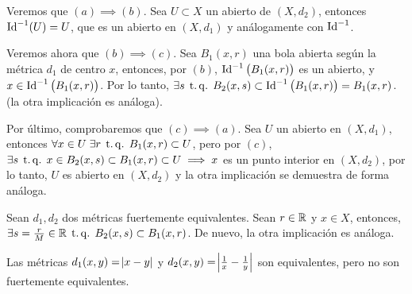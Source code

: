 \begin{eje}
    Veremos que $(a) \implies (b)$. Sea $U \subset X$ un abierto de $(X, d_2)$, entonces $\operatorname{Id}^{-1}(U) = U$, que es un abierto en $(X,d_1)$ y análogamente con $\operatorname{Id}^{-1}$.
    
    Veremos ahora que $(b) \implies (c)$. Sea $B_1(x, r)$ una bola abierta según la m\'etrica $d_1$ de centro $x$, entonces, por $(b)$, $\operatorname{Id}^{-1}\left( B_1(x,r) \right)$
    es un abierto, y $x \in \operatorname{Id}^{-1}\left( B_1(x,r) \right)$. Por lo tanto, $\exists s \operatorname{\;t.q.\;} B_2(x,s) \subset \operatorname{Id}^{-1}\left( B_1(x,r) \right) = B_1(x,r)$. (la otra
    implicación es análoga).

    Por último, comprobaremos que $(c) \implies (a)$. Sea $U$ un abierto en $(X,d_1)$, entonces $\forall x \in U \; \exists r \operatorname{\;t.q.\;} B_1(x,r) \subset U$, pero por $(c)$,
    $\exists s \operatorname{\;t.q.\;} x \in B_2(x,s) \subset B_1(x,r) \subset U \implies x$ es un punto interior en $(X, d_2)$, por lo tanto, $U$ es abierto en $(X, d_2)$ y la otra
    implicación se demuestra de forma análoga.
\end{eje}

\begin{eje}
    Sean $d_1, d_2$ dos m\'etricas fuertemente equivalentes. Sean $r \in \mathbb{R}$ y $x \in X$, entonces, $\exists s = \frac{r}{M} \in \mathbb{R} \operatorname{\;t.q.\;} B_2(x, s) \subset B_1(x, r)$.
    De nuevo, la otra implicación es análoga.

    Las m\'etricas $d_1(x,y) = \abs{x-y}$ y $d_2(x,y) = \abs{\frac{1}{x} - \frac{1}{y}}$ son equivalentes, pero no son fuertemente equivalentes.
\end{eje}

